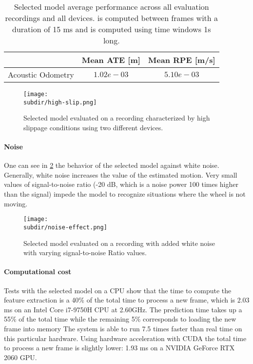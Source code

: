 \begin{table}
    \centering
    \begin{tabular}{|c|c|c|}
        \hline
                          & Mean ATE [m] & Mean RPE [m/s] \\ \hline
        Acoustic Odometry & $1.02e-03$   & $5.10e-03$     \\
        \hline
    \end{tabular}
    \caption[Selected model average performance across evaluation recordings
        and devices]{Selected model average performance across all evaluation
        recordings and all devices.  is computed between
        frames with a duration of 15 ms and  is computed
        using time windows 1s long.}
    \label{table:results-selected-model}
\end{table}


\begin{figure}
    \centering
    \texttt{[image: \\subdir/high-slip.png]}
    \caption[Selected model on high slippage conditions]{Selected model
        evaluated on a recording characterized by high slippage conditions
        using two different devices.}
    \label{fig:high-slip}
\end{figure}

\paragraph{Noise} One can see in \cref{fig:noise-effect} the behavior of the
selected model against white noise. Generally, white noise increases the value
of the estimated motion. Very small values of signal-to-noise ratio (-20 dB,
which is a noise power 100 times higher than the signal) impede the model to
recognize situations where the wheel is not moving.

\begin{figure}
    \centering
    \texttt{[image: \\subdir/noise-effect.png]}
    \caption[Selected model with white noise]{Selected model evaluated on a
        recording with added white noise with varying signal-to-noise Ratio
        values.}
    \label{fig:noise-effect}
\end{figure}

\paragraph{Computational cost} Tests with the selected model on a CPU show that
the time to compute the feature extraction is a 40\% of the total time to
process a new frame, which is 2.03 ms on an Intel\textregistered{}
Core\texttrademark{} i7-9750H CPU at 2.60GHz. The prediction time takes up a
55\% of the total time while the remaining 5\% corresponds to loading the new
frame into memory The system is able to run 7.5 times faster than real time on
this particular hardware. Using hardware acceleration with CUDA the total time
to process a new frame is slightly lower: 1.93 ms on a NVIDIA GeForce RTX
2060 GPU.

